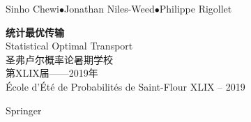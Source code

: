\clearpage
\thispagestyle{empty}
\noindent Sinho Chewi\enspace$\bullet$\enspace Jonathan Niles-Weed\enspace$\bullet$\enspace Philippe Rigollet
\vspace{3cm}
\begin{center}
{\Huge\bfseries 统计最优传输}\\[0.8cm]
{\Large Statistical Optimal Transport}\\[1cm]
{\Large 圣弗卢尔概率论暑期学校\\[0.3cm]第XLIX届——2019年}\\[0.5cm]
École d’Été de Probabilités de Saint-Flour XLIX -- 2019
\end{center}
\vfill
\noindent Springer
